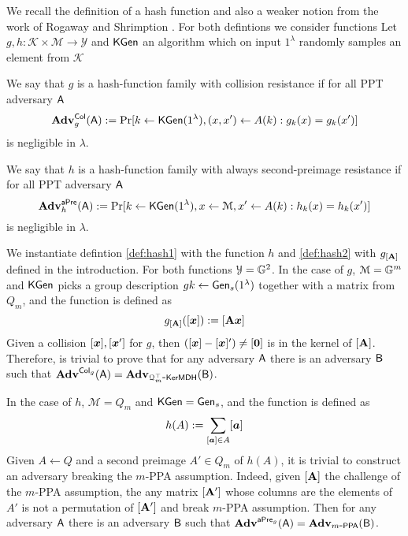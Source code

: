 We recall the definition of a hash function and also a weaker notion from the work of Rogaway and Shrimption \cite{FSE:RogShr04}. For both defintions we consider functions Let $g,h:\mathcal{K}\times\mathcal{M}\to\mathcal{Y}$ and $\mathsf{KGen}$ an algorithm which on input $1^\lambda$ randomly samples an element from $\mathcal{K}$

\begin{definition}\label{def:hash1}
 We say that $g$ is a hash-function family with collision resistance if for all PPT adversary $\mathsf{A}$
$$
\mathbf{Adv}_g^{\mathsf{Col}}(\mathsf{A}) := \Pr[k\gets\mathsf{KGen}(1^\lambda), (x,x')\gets A(k):g_k(x)=g_k(x')]
$$ 
is negligible in $\lambda$.
\end{definition}

\begin{definition}\label{def:hash2}
 We say that $h$ is a hash-function family with always second-preimage resistance if for all PPT adversary $\mathsf{A}$
$$
\mathbf{Adv}_h^{\mathsf{aPre}}(\mathsf{A}) := \Pr[k\gets\mathsf{KGen}(1^\lambda), x\gets\mathcal{M}, x'\gets A(k):h_k(x)=h_k(x')]
$$ 
is negligible in $\lambda$.
\end{definition}

We instantiate defintion \ref{def:hash1} with the function $h$ and \ref{def:hash2}  with $g_{[\mathbf{{A}}]}$ defined in the introduction. For both functions $\mathcal{Y}=\mathbb{G}^2$. In the case of $g$, $\mathcal{M}=\mathbb{G}^m$ and $\mathsf{KGen}$ picks a group description $gk\gets\mathsf{Gen}_s(1^\lambda)$ together with a matrix from $Q_m$, and the function is defined as
$$
g_{[\mathbf{{A}}]}([{\boldsymbol{x}}]):= [\mathbf{{A}}{\boldsymbol{x}}]
$$
Given a collision $[{\boldsymbol{x}}],[{\boldsymbol{x}}']$ for $g$, then $([{\boldsymbol{x}}]-[{\boldsymbol{x}}]')\neq [{\boldsymbol{0}}]$ is in the kernel of $[\mathbf{{A}} ]$. Therefore, is trivial to prove that for any adversary $\mathsf{A}$ there is an adversary $\mathsf{B}$ such that $\mathbf{Adv}^{\mathsf{Col}_g}(\mathsf{A})=\mathbf{Adv}_{\mathcal{Q}_m^\top\mbox{-}\mathsf{KerMDH}}(\mathsf{B})$.

 In the case of $h$, $\mathcal{M}=Q_m$ and $\mathsf{KGen}=\mathsf{Gen}_s$, and the function is defined as
$$
h(A):= \sum_{[{\boldsymbol{a}}]\in A}[{\boldsymbol{a}}]
$$
Given $A\gets Q$ and a second preimage $A'\in Q_m$ of $h(A)$, it is trivial to construct an adversary breaking the $m$-PPA assumption. Indeed, given $[\mathbf{{A}}]$ the challenge of the $m$-PPA assumption, the any matrix $[\mathbf{{A}}']$ whose columns are the elements of $A'$ is not a permutation of $[\mathbf{{A}}']$ and break $m$-PPA assumption. Then for any adversary $\mathsf{A}$ there is an adversary $\mathsf{B}$ such that $\mathbf{Adv}^{\mathsf{aPre}_g}(\mathsf{A})=\mathbf{Adv}_{m\mbox{-}\mathsf{PPA}}(\mathsf{B})$.

